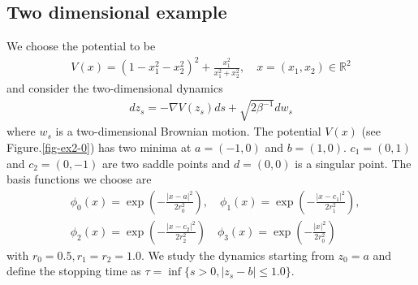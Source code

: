 \documentclass[final]{siamltex}
\begin{document}
\subsection{Two dimensional example}
We choose the potential to be 
\begin{align}
V(x) = (1 - x_1^2 - x_2^2)^2 + \frac{x_1^2}{x_1^2 + x_2^2}, \quad x = (x_1,x_2) \in \mathbb{R}^2
\end{align}
and consider the two-dimensional dynamics
\begin{align}
  dz_s = - \nabla V(z_s) ds + \sqrt{2\beta^{-1}} dw_s
\end{align}
where $w_s$ is a two-dimensional Brownian motion.
The potential $V(x)$ (see Figure.\ref{fig-ex2-0}) has two minima at $a = (-1, 0)$ and $b = (1,0)$.
$c_1 = (0, 1)$ and $c_2 = (0,-1)$ are two saddle points and $d=(0,0)$ is a
singular point. The basis functions we choose are 
\begin{align}
  & \phi_0(x) = \exp(-\frac{|x - a|^2}{2r_0^2}), \quad \phi_1(x) = \exp(-\frac{|x - c_1|^2}{2r_1^2}), \\
  & \phi_2(x) = \exp(-\frac{|x - c_2|^2}{2r_2^2}) \quad \phi_3(x) = \exp(-\frac{|x|^2}{2r_0^2}) 
\end{align}
with $r_0 = 0.5, r_1 = r_2 = 1.0$. We study the dynamics starting from $z_0 =
a$ and define the stopping time as $\tau = \inf\{s > 0, |z_s - b| \le 1.0\}$.
\end{document}
